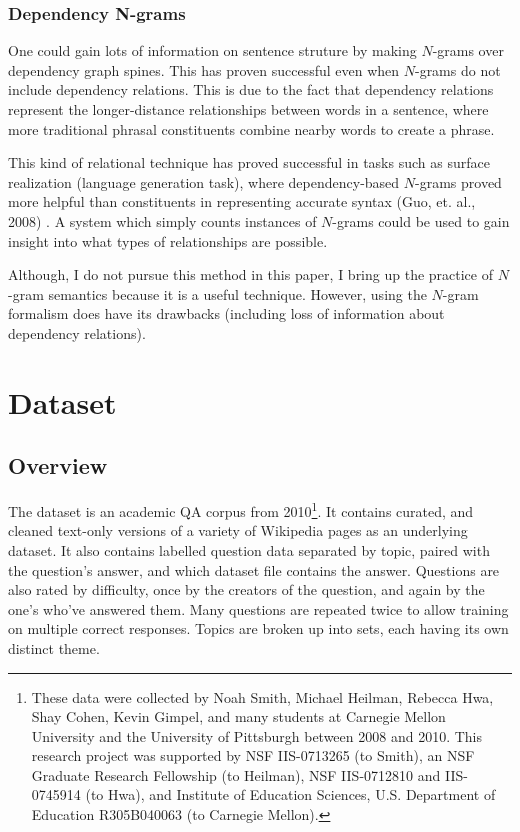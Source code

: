 \documentclass[twoside]{article}
\begin{document}
\subsubsection{Dependency N-grams}

One could gain lots of information on sentence struture by making $N$-grams over dependency graph spines.  This has proven successful even when $N$-grams do not include dependency relations.  This is due to the fact that dependency relations represent the longer-distance relationships between words in a sentence, where more traditional phrasal constituents combine nearby words to create a phrase.

This kind of relational technique has proved successful in tasks such as surface realization (language generation task), where dependency-based $N$-grams proved more helpful than constituents in representing accurate syntax (Guo, et. al., 2008) \cite{guo08}.  A system which simply counts instances of $N$-grams could be used to gain insight into what types of relationships are possible.

Although, I do not pursue this method in this paper, I bring up the practice of $N$-gram semantics because it is a useful technique.  However, using the $N$-gram formalism does have its drawbacks (including loss of information about dependency relations).

\section{Dataset}

\subsection{Overview}

The dataset is an academic QA corpus from 2010\footnote{These data were collected by Noah Smith, Michael Heilman, Rebecca Hwa, Shay Cohen, Kevin Gimpel, and many students at Carnegie Mellon University and the University of Pittsburgh between 2008 and 2010. This research project was supported by NSF IIS-0713265 (to Smith), an NSF Graduate Research Fellowship (to Heilman), NSF IIS-0712810 and IIS-0745914 (to Hwa), and Institute of Education Sciences, U.S. Department of Education R305B040063 (to Carnegie Mellon).}.  It contains curated, and cleaned text-only versions of a variety of Wikipedia pages as an underlying dataset.  It also contains labelled question data separated by topic, paired with the question's answer, and which dataset file contains the answer.  Questions are also rated by difficulty, once by the creators of the question, and again by the one's who've answered them.  Many questions are repeated twice to allow training on multiple correct responses.  Topics are broken up into sets, each having its own distinct theme.
\end{document}

